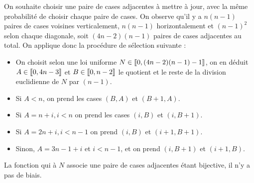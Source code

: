 \documentclass[11pt, openany]{article}
\newcommand{\cg }{[\kern-0.15em [}
\newcommand{\cd}{]\kern-0.15em]}
\begin{document}
On souhaite choisir une paire de cases adjacentes à mettre à jour, avec la même probabilité de choisir chaque paire de cases. On observe qu'il y a $n(n-1)$ paires de cases voisines verticalement, $n(n-1)$ horizontalement et $(n-1)^2$ selon chaque diagonale, soit $(4n-2)(n-1)$ paires de cases adjacentes au total. On applique donc la procédure de sélection suivante : \begin{itemize}

\item{On choisit selon une loi uniforme $N \in \cg 0, (4n-2)(n-1) -1 \cd$, on en déduit $A \in \cg 0, 4n-3 \cd$ et $B \in \cg 0, n-2\cd$ le quotient et le reste de la division euclidienne de $N$ par $(n-1)$.  }
\item{Si $A<n$, on prend les cases $(B,A)$ et $(B+1,A)$.}
\item{Si $A = n+i, i<n$ on prend les cases $(i,B)$ et $(i,B+1)$.}
\item{Si $A = 2n+i,i<n-1$ on prend $(i,B)$ et $(i+1, B+1)$.}
\item{Sinon, $A = 3n-1+i$ et $i<n-1$, et on prend $(i, B+1)$ et $(i+1, B)$.}



\end{itemize}
La fonction qui à $N$ associe une paire de cases adjacentes étant bijective, il n'y a pas de biais.


\bigskip
\end{document}
